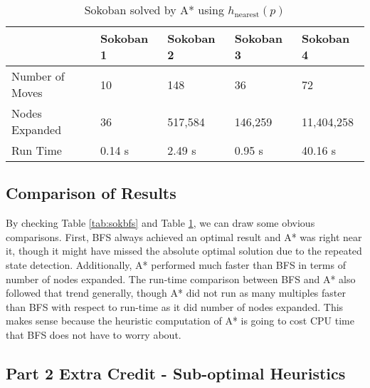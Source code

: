 \documentclass{article}[12pt]
\begin{document}
	\begin{table}[ht]
   \centering
   \begin{tabular}{l | l | l | l | l }
   \hline
    & Sokoban 1 & Sokoban 2 & Sokoban 3 & Sokoban 4\\
    \hline \hline 
   Number of Moves & 10 & 148 & 36 & 72 \\
   Nodes Expanded & 36 & 517,584 & 146,259 & 11,404,258\\
   Run Time & 0.14 s & 2.49 s & 0.95 s & 40.16 s\\
   \hline
   \end{tabular}
   \caption{Sokoban solved by A* using $h_{\text{nearest}}(p)$} \label{tab:sokastar}
   \end{table}
   
   
   \subsection{Comparison of Results}
   By checking Table \ref{tab:sokbfs} and Table \ref{tab:sokastar}, we can draw some obvious comparisons. First, BFS always achieved an optimal result and A* was right near it, though it might have missed the absolute optimal solution due to the repeated state detection. Additionally, A* performed much faster than BFS in terms of number of nodes expanded. The run-time comparison between BFS and A* also followed that trend generally, though A* did not run as many multiples faster than BFS with respect to run-time as it did number of nodes expanded. This makes sense because the heuristic computation of A* is going to cost CPU time that BFS does not have to worry about.  
   
\newpage
   \subsection{Part 2 Extra Credit - Sub-optimal Heuristics}   
   
\end{document}
